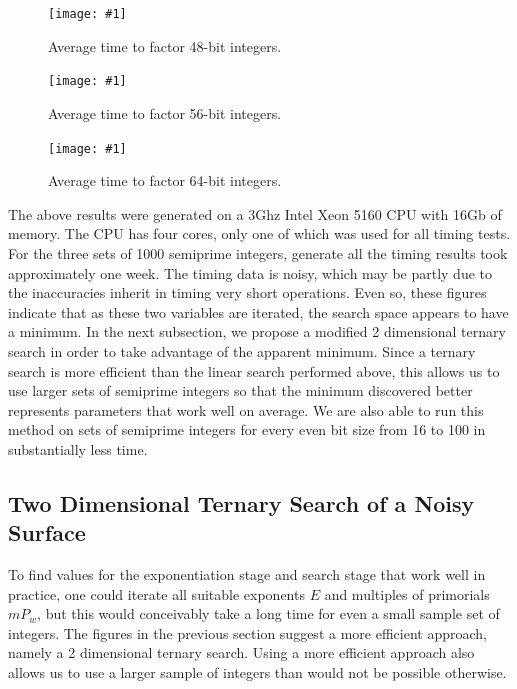\documentclass{ucalgthes1}
\theoremstyle{definition}
\newcommand{\mygraphXPNG}[4]{
	\begin{figure}[htb]
	\centering
	\texttt{[image: \#1]}
	\caption[#4]{#3}
	\label{#2}
	\end{figure}
}
\begin{document}
\mygraphXPNG{bits-48-3d.png}{fig:search48td}{Average time to factor 48-bit integers.}{48-bit Factoring Search Space.}
\mygraphXPNG{bits-56-3d.png}{fig:search56td}{Average time to factor 56-bit integers.}{56-bit Factoring Search Space.}
\mygraphXPNG{bits-64-3d.png}{fig:search64td}{Average time to factor 64-bit integers.}{64-bit Factoring Search Space.}

\clearpage

The above results were generated on a 3Ghz Intel Xeon 5160 CPU with 16Gb of memory.  The CPU has four cores, only one of which was used for all timing tests.  For the three sets of 1000 semiprime integers, generate all the timing results took approximately one week.  The timing data is noisy, which may be partly due to the inaccuracies inherit in timing very short operations.  Even so, these figures indicate that as these two variables are iterated, the search space appears to have a minimum.  In the next subsection, we propose a modified 2 dimensional ternary search in order to take advantage of the apparent minimum.  Since a ternary search is more efficient than the linear search performed above, this allows us to use larger sets of semiprime integers so that the minimum discovered better represents parameters that work well on average.  We are also able to run this method on sets of semiprime integers for every even bit size from 16 to 100 in substantially less time.



\subsection{Two Dimensional Ternary Search of a Noisy Surface}
\label{subsec:ssparNoisyCurve}

\newcommand{\xmin}{x_{\textrm{min}}}
\newcommand{\xmax}{x_{\textrm{max}}}
\newcommand{\xlo}{x_{\textrm{lo}}}
\newcommand{\xhi}{x_{\textrm{hi}}}
\newcommand{\xonethird}{x_\ell}
\newcommand{\xtwothird}{x_h}
\newcommand{\ymin}{y_{\textrm{min}}}
\newcommand{\ymax}{y_{\textrm{max}}}
\newcommand{\ylo}{y_{\textrm{lo}}}
\newcommand{\yhi}{y_{\textrm{hi}}}
\newcommand{\yonethird}{y_\ell}
\newcommand{\ytwothird}{y_h}
\newcommand{\tonethird}{t_\ell}
\newcommand{\ttwothird}{t_h}
\newcommand{\timefnc}{\mathcal T}

To find values for the exponentiation stage and search stage that work well in practice, one could iterate all suitable exponents $E$ and multiples of primorials $mP_w$, but this would conceivably take a long time for even a small sample set of integers.  The figures in the previous section suggest a more efficient approach, namely a 2 dimensional ternary search.  Using a more efficient approach also allows us to use a larger sample of integers than would not be possible otherwise.
\end{document}
